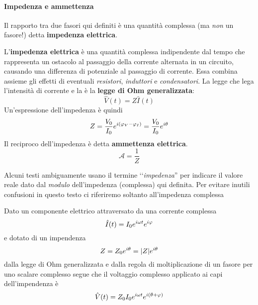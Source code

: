 \paragraph{Impedenza  e ammettenza}
Il rapporto tra due fasori qui definiti è una quantità complessa (ma \textit{non} un fasore!) detta \textbf{impedenza elettrica}.
\begin{define}
	L'\textbf{impedenza elettrica} è una quantità complessa indipendente dal tempo che rappresenta un ostacolo al passaggio della corrente alternata in un circuito, causando una differenza di potenziale al passaggio di corrente. Essa combina assieme gli effetti di eventuali \textit{resistori}, \textit{induttori} e \textit{condensatori}. La legge che lega l'intensità di corrente e la \ddp è la \textbf{legge di Ohm generalizzata}:
	\begin{equation}
		\hat{V}(t)=Z\hat{I}(t)
	\end{equation}
	Un'espressione dell'impedenza è quindi
	\begin{equation}
		Z=\frac{V_0}{I_0}e^{i(\oldphi_V-\oldphi_I)}=\frac{V_0}{I_0}e^{i\theta}
	\end{equation}
	Il reciproco dell'impedenza è detta \textbf{ammettenza elettrica}.
	\begin{equation}
		\mathcal{A}=\frac{1}{Z}
	\end{equation}
\end{define}
\begin{attention}
	Alcuni testi ambiguamente usano il termine ‘‘\textit{impedenza}'' per indicare il valore reale dato dal \textit{modulo} dell'impedenza (complessa) qui definita. Per evitare inutili confusioni in questo testo ci riferiremo soltanto all'impedenza complessa
\end{attention}
Dato un componente elettrico attraversato da una corrente complessa
\begin{equation*}
	\hat{I}(t)=I_0e^{i\omega t}e^{i\oldphi}
\end{equation*}
e dotato di un impendenza
\begin{equation}
	Z=Z_0e^{i\theta}=\abs{Z}e^{i\theta}
\end{equation}
dalla legge di Ohm generalizzata e dalla regola di moltiplicazione di un fasore per uno scalare complesso segue che il voltaggio complesso applicato ai capi dell'impendenza è
\begin{equation}
	\hat{V}(t)=Z_0I_0e^{i\omega t}e^{i(\theta+\oldphi)}
\end{equation}
